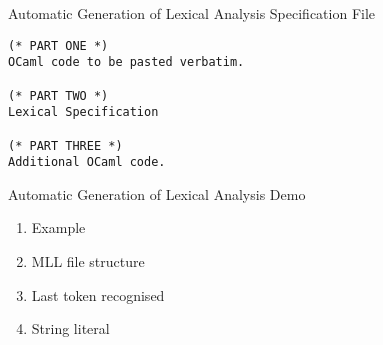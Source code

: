 \documentclass{beamer}
\begin{document}
\begin{frame}[fragile]{Automatic Generation of Lexical Analysis}
{Specification File}

\begin{lstlisting}[style=camlcode]
(* PART ONE *)
OCaml code to be pasted verbatim.

(* PART TWO *)
Lexical Specification

(* PART THREE *)
Additional OCaml code.

\end{lstlisting}
\end{frame}

\begin{frame}[fragile]{Automatic Generation of Lexical Analysis}
{Demo}

\begin{scriptsize}

\begin{enumerate}
\item Example
\item MLL file structure
\item Last token recognised
\item String literal
\end{enumerate}
\end{scriptsize}
\end{frame}
\end{document}
